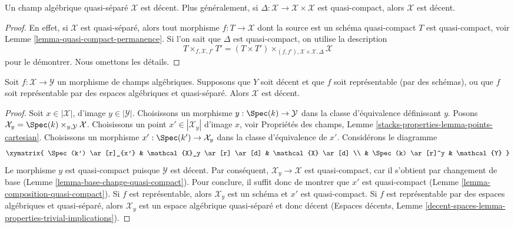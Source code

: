 \begin{lemma}
\label{lemma-quasi-separated-decent}
Un champ algébrique quasi-séparé $\mathcal{X}$ est décent.
Plus généralement, si $\Delta : \mathcal{X} \to \mathcal{X} \times \mathcal{X}$
est quasi-compact, alors $\mathcal{X}$ est décent.
\end{lemma}

\begin{proof}
En effet, si $\mathcal{X}$ est quasi-séparé, alors
tout morphisme $f : T \to \mathcal{X}$ dont la source est un schéma
quasi-compact $T$ est quasi-compact, voir
Lemme \ref{lemma-quasi-compact-permanence}.
Si l'on sait que $\Delta$ est quasi-compact, on utilise la description
$$
T \times_{f, \mathcal{X}, f'} T' =
(T \times T')
\times_{(f, f'), \mathcal{X} \times \mathcal{X}, \Delta}
\mathcal{X}
$$
pour le démontrer. Nous omettons les détails.
\end{proof}

\begin{lemma}
\label{lemma-representable-decent}
Soit $f : \mathcal{X} \to \mathcal{Y}$ un morphisme
de champs algébriques. Supposons que $Y$ soit décent
et que $f$ soit représentable (par des schémas), ou que $f$ soit représentable
par des espaces algébriques et quasi-séparé.
Alors $\mathcal{X}$ est décent.
\end{lemma}

\begin{proof}
Soit $x \in |\mathcal{X}|$, d'image $y \in |\mathcal{Y}|$.
Choisissons un morphisme $y : \Spec(k) \to \mathcal{Y}$
dans la classe d'équivalence définissant $y$.
Posons $\mathcal{X}_y = \Spec(k) \times_{y, \mathcal{Y}} \mathcal{X}$.
Choisissons un point $x' \in |\mathcal{X}_y|$ d'image $x$, voir
Propriétés des champs, Lemme \ref{stacks-properties-lemma-points-cartesian}.
Choisissons un morphisme $x' : \Spec(k') \to \mathcal{X}_y$ dans la classe
d'équivalence de $x'$. Considérons le diagramme
$$
\xymatrix{
\Spec(k') \ar[r]_{x'} &
\mathcal{X}_y \ar[r] \ar[d] &
\mathcal{X} \ar[d] \\
&
\Spec(k) \ar[r]^y &
\mathcal{Y}
}
$$
Le morphisme $y$ est quasi-compact puisque $\mathcal{Y}$ est décent.
Par conséquent, $\mathcal{X}_y \to \mathcal{X}$ est quasi-compact, car il
s'obtient par changement de base
(Lemme \ref{lemma-base-change-quasi-compact}).
Pour conclure, il suffit donc de montrer que $x'$ est quasi-compact
(Lemme \ref{lemma-composition-quasi-compact}).
Si $f$ est représentable, alors $\mathcal{X}_y$ est un schéma
et $x'$ est quasi-compact.
Si $f$ est représentable par des espaces algébriques et quasi-séparé,
alors $\mathcal{X}_y$ est un espace algébrique quasi-séparé
et donc décent (Espaces décents, Lemme
\ref{decent-spaces-lemma-properties-trivial-implications}).
\end{proof}

